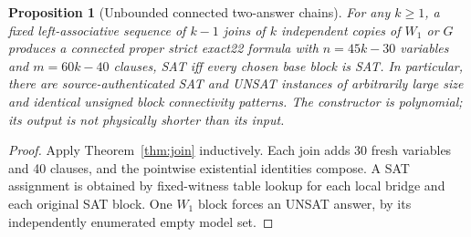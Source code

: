 \documentclass[10pt]{article}
\newtheorem{proposition}[theorem]{Proposition}
\begin{document}
\begin{proposition}[Unbounded connected two-answer chains]\label{prop:chain}
For any $k\ge1$, a fixed left-associative sequence of $k-1$ joins of $k$ independent copies of $W_1$ or $G$ produces a connected proper strict exact22 formula with $n=45k-30$ variables and $m=60k-40$ clauses, SAT iff \emph{every} chosen base block is SAT. In particular, there are source-authenticated SAT and UNSAT instances of arbitrarily large size and identical unsigned block connectivity patterns. The constructor is polynomial; its output is not physically shorter than its input.
\end{proposition}
\begin{proof}
Apply Theorem~\ref{thm:join} inductively. Each join adds 30 fresh variables and 40 clauses, and the pointwise existential identities compose. A SAT assignment is obtained by fixed-witness table lookup for each local bridge and each original SAT block. One $W_1$ block forces an UNSAT answer, by its independently enumerated empty model set.\end{proof}
\end{document}
